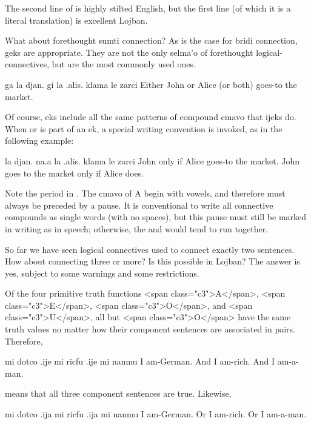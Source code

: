 The second line of  is highly
    stilted English, but the first line (of which it is a literal
    translation) is excellent Lojban.

What about forethought sumti connection? As is the case for
    bridi connection, geks are appropriate. They are not the only
    selma'o of forethought logical-connectives, but are the most
    commonly used ones.
\begin{example}
ga la djan. gi la .alis. klama le zarci\n
Either John or Alice (or both) goes-to the market.
\end{example}

Of course, eks include all the same patterns of compound cmavo
    that ijeks do. When  or  is part of an ek, a
    special writing convention is invoked, as in the following
    example:
\begin{example}
la djan. na.a la .alis. klama le zarci\n
John only if Alice goes-to the market.\n
John goes to the market only if Alice does.
\end{example}

Note the period in . The cmavo of A begin with
    vowels, and therefore must always be preceded by a pause. It is
    conventional to write all connective compounds as single words
    (with no spaces), but this pause must still be marked in
    writing as in speech; otherwise, the  and  would
    tend to run together.



So far we have seen logical connectives used to connect
    exactly two sentences. How about connecting three or more? Is
    this possible in Lojban? The answer is yes, subject to some
    warnings and some restrictions.

Of the four primitive truth functions <span
    class="c3">A</span>, <span class="c3">E</span>, <span
    class="c3">O</span>, and <span class="c3">U</span>, all but
    <span class="c3">O</span> have the same truth values no matter
    how their component sentences are associated in pairs.
    Therefore,
\begin{example}
mi dotco .ije mi ricfu .ije mi nanmu\n
I am-German.  And I am-rich.  And I am-a-man.
\end{example}

{\noindent}means that all three component sentences are true. Likewise,
\begin{example}
mi dotco .ija mi ricfu .ija mi nanmu\n
I am-German.  Or I am-rich.  Or I am-a-man.
\end{example}

